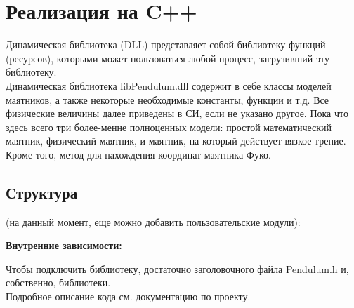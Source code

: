 \section*{Реализация на C++}
Динамическая библиотека (DLL) представляет собой библиотеку функций (ресурсов), которыми может пользоваться любой процесс, загрузивший эту библиотеку.\\
Динамическая библиотека libPendulum.dll содержит в себе классы моделей маятников, а также некоторые необходимые константы, функции и т.д. Все физические величины далее приведены в СИ, если не указано другое. Пока что здесь всего три более-менне полноценных модели: простой математический маятник, физический маятник, и маятник, на который действует вязкое трение. Кроме того, метод для нахождения координат маятника Фуко. \\
\subsection*{Структура}
{ (на данный момент, еще можно добавить пользовательские модули):}
\begin{center}
\end{center}
{\centering \bfseries Внутренние зависимости:}
\begin{center}
\end{center}
Чтобы подключить библиотеку, достаточно заголовочного файла Pendulum.h и, собственно, библиотеки.\\
Подробное описание кода см. документацию по проекту.
